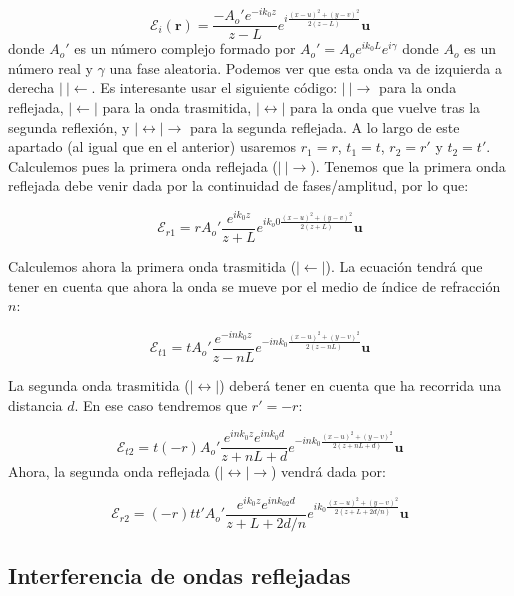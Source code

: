 \documentclass[12pt,a4paper]{book}
\numberwithin{equation}{section}
\numberwithin{figure}{section}
\newcommand{\1}{_{(1)}}
\newcommand{\2}{_{(2)}}
\newcommand{\un}{\mathbf{u}}
\newcommand{\rn}{\mathbf{r}}
\newcommand{\Encal}{\boldsymbol{\mathcal{E}}}
\theoremstyle{definition}
\begin{document}
\begin{equation}
\Encal_i (\rn) = \frac{-A_o' e^{-ik_0z}}{z-L} e^{i \frac{(x-u)^2+(y-v)^2}{2(z-L)}} \un
\end{equation}
donde $A_o'$ es un número complejo formado por $A_o' =A_o e^{ik_0L}e^{i \gamma}$ donde $A_o$ es un número real y $\gamma$ una fase aleatoria. Podemos ver que esta onda va de izquierda a derecha $| \ | \leftarrow$. Es interesante usar el siguiente código: $| \ | \rightarrow$ para la onda reflejada, $| \leftarrow | $ para la onda trasmitida, $|\leftrightarrow |$ para la onda que vuelve tras la segunda reflexión, y $|\leftrightarrow |\rightarrow$ para la segunda reflejada. A lo largo de este apartado (al igual que en el anterior) usaremos $r_1=r$, $t_1=t$, $r_2=r'$ y $t_2=t'$. \\

Calculemos pues la primera onda reflejada ($| \ |\rightarrow$). Tenemos que la primera onda reflejada debe venir dada por la continuidad de fases/amplitud, por lo que:

\begin{equation}
\Encal_{r1} = rA_o' \frac{e^{ik_0z}}{z+L} e^{i k_o0 \frac{(x-u)^2+(y-v)^2}{2(z+L)}} \un
\end{equation}

Calculemos ahora la primera onda trasmitida ($| \leftarrow |$). La ecuación tendrá que tener en cuenta que ahora la onda se mueve por el medio de índice de refracción $n$:

\begin{equation}
\Encal_{t1} = tA_o' \frac{e^{-ink_0z}}{z-nL} e^{-i n k_0 \frac{(x-u)^2+(y-v)^2}{2(z-nL)}} \un
\end{equation}

La segunda onda trasmitida ($|\leftrightarrow|$) deberá tener en cuenta que ha recorrida una distancia $d$. En ese caso tendremos que $r'=-r$: 

\begin{equation}
\Encal_{t2} = t(-r)A_o' \frac{e^{ink_0z}e^{ink_0d}}{z+nL+d} e^{-i n k_0  \frac{(x-u)^2+(y-v)^2}{2(z+nL+d)}} \un
\end{equation}
Ahora, la segunda onda reflejada ($|\leftrightarrow|\rightarrow$) vendrá dada por:

\begin{equation}
\Encal_{r2} = (-r)tt' A_o' \frac{e^{ik_0z}e^{ink_02d}}{z+L+2d/n}  e^{ik_0\frac{(x-u)^2+(y-v)^2}{2(z+L+2d/n)}} \un
\end{equation}

\subsection{Interferencia de ondas reflejadas}
\end{document}
